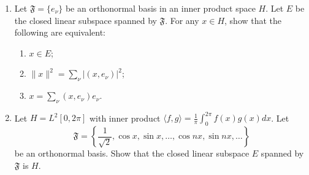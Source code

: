 \begin{exercise}
\label{analysis:2012:11}
\begin{enumerate}
    \item Let $\mathfrak{F} = \{e_\nu\}$ be an orthonormal basis in an inner product space $H$. Let $E$ be the closed linear subspace spanned by $\mathfrak{F}$. For any $x \in H$, show that the following are equivalent:
    \begin{enumerate}
        \item $x \in E$;
        \item $\|x\|^2 = \sum_\nu |(x, e_\nu)|^2$;
        \item $x = \sum_\nu (x, e_\nu) e_\nu$.
    \end{enumerate}
    \item Let $H = L^2[0, 2\pi]$ with inner product $\langle f, g \rangle = \frac{1}{\pi} \int_0^{2\pi} f(x)g(x) dx$. Let
    \[ \mathfrak{F} = \left\{ \frac{1}{\sqrt{2}}, \cos x, \sin x, \dots, \cos nx, \sin nx, \dots \right\} \]
    be an orthonormal basis. Show that the closed linear subspace $E$ spanned by $\mathfrak{F}$ is $H$.
\end{enumerate}
\end{exercise}

